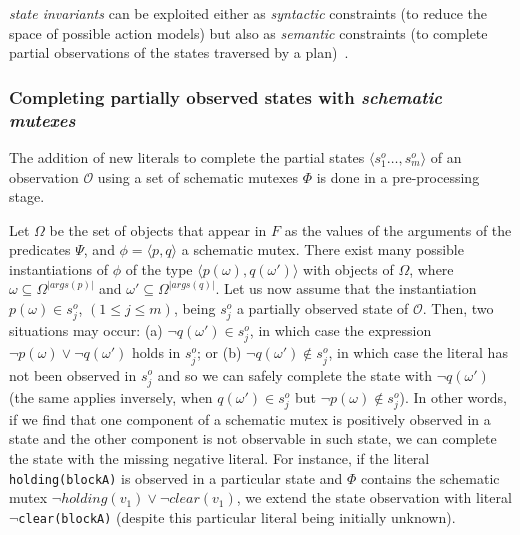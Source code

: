 \documentclass[letterpaper]{article} %
\newcommand{\tup}[1]{{\langle #1 \rangle}}
\begin{document}
{\it state invariants} can be exploited either as {\em syntactic} constraints (to reduce the space of possible action models) but also as {\em semantic} constraints (to complete partial observations of the states traversed by a plan)~\cite{fox:TIM:JAIR1998}.

\subsubsection{Completing partially observed states with {\em schematic mutexes}}

The addition of new literals to complete the partial states $\tup{s_1^o \ldots, s_m^o}$ of an observation $\mathcal{O}$  using a set of schematic mutexes $\Phi$ is done in a pre-processing stage.

Let $\Omega$ be the set of objects that appear in $F$ as the values of the arguments of the predicates $\Psi$, and $\phi=\tup{p,q}$ a schematic mutex. There exist many possible instantiations of $\phi$ of the type $\tup{p(\omega),q(\omega')}$ with objects of $\Omega$, where $\omega\subseteq\Omega^{|args(p)|}$ and $\omega'\subseteq\Omega^{|args(q)|}$. Let us now assume that the instantiation $p(\omega) \in s_j^o$, {\small $(1\leq j\leq m)$}, being $s_j^o$ a partially observed state of $\mathcal{O}$. Then, two situations may occur: (a) $\neg q(\omega') \in s_j^o$, in which case the expression $\neg p(\omega) \vee \neg q(\omega')$ holds in $s_j^o$; or (b) $\neg q(\omega') \notin s_j^o$, in which case the literal has not been observed in $s_j^o$ and so we can safely complete the state with $\neg q(\omega')$ (the same applies inversely, when $q(\omega') \in s_j^o$ but $\neg p(\omega) \notin s_j^o$). In other words, if we find that one component of a schematic mutex is positively observed in a state and the other component is not observable in such state, we can complete the state with the missing negative literal. For instance, if the literal {\tt\small holding(blockA)} is observed in a particular state and $\Phi$ contains the schematic mutex $\neg holding(v_1)\vee\neg clear(v_1)$, we extend the state observation with literal {\tt\small $\neg$clear(blockA)} (despite this particular literal being initially unknown).
\end{document}

